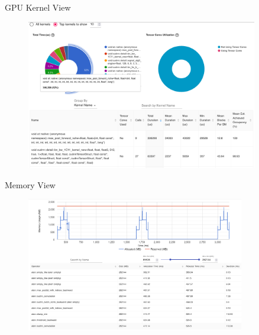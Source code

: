 \documentclass[compress,aspectratio=169]{beamer}
\begin{document}
\begin{frame}{GPU Kernel View}
    \vspace{-1em}
\begin{center}
    \begin{figure}
        \includegraphics[width=0.9\textwidth]{../../data/scap_gtx1080_profiler-torch_batch-size-64_14650758_gpu-kernel-view}
    \end{figure}
    \end{center}
\end{frame}

\begin{frame}{Memory View}
    \vspace{-1em}
\begin{center}
    \begin{figure}
        \includegraphics[width=0.85\textwidth]{../../data/scap_gtx1080_profiler-torch_batch-size-64_14650758_memory-view}
    \end{figure}
    \end{center}
\end{frame}
\end{document}

